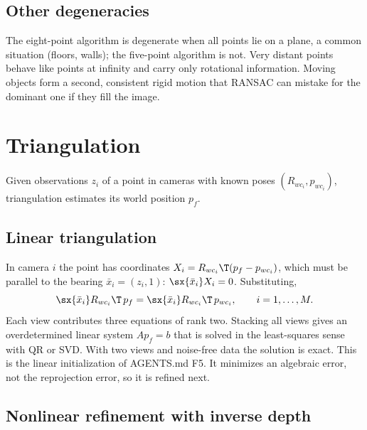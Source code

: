 \subsection{Other degeneracies}

The eight-point algorithm is degenerate when all points lie on a plane, a common situation (floors, walls); the
five-point algorithm is not. Very distant points behave like points at infinity and carry only rotational
information. Moving objects form a second, consistent rigid motion that RANSAC can mistake for the dominant one if they
fill the image.

\section{Triangulation}
\label{sec:triangulation}

Given observations $z_i$ of a point in cameras with known poses $(R_{wc_i}, p_{wc_i})$, triangulation estimates its world
position $p_f$.

\subsection{Linear triangulation}

In camera $i$ the point has coordinates $X_i = R_{wc_i}\T(p_f - p_{wc_i})$, which must be parallel to the bearing
$\bar x_i = (z_i, 1)$: $\sx{\bar x_i}X_i = 0$. Substituting,
\begin{equation}
  \sx{\bar x_i}R_{wc_i}\T\, p_f = \sx{\bar x_i}R_{wc_i}\T\, p_{wc_i}, \qquad i = 1,\dots,M .
  \label{eq:dlt}
\end{equation}
Each view contributes three equations of rank two. Stacking all views gives an overdetermined linear system
$A p_f = b$ that is solved in the least-squares sense with QR or SVD. With two views and noise-free data the solution is
exact. This is the linear initialization of AGENTS.md F5. It minimizes an algebraic error, not the reprojection error,
so it is refined next.

\subsection{Nonlinear refinement with inverse depth}


